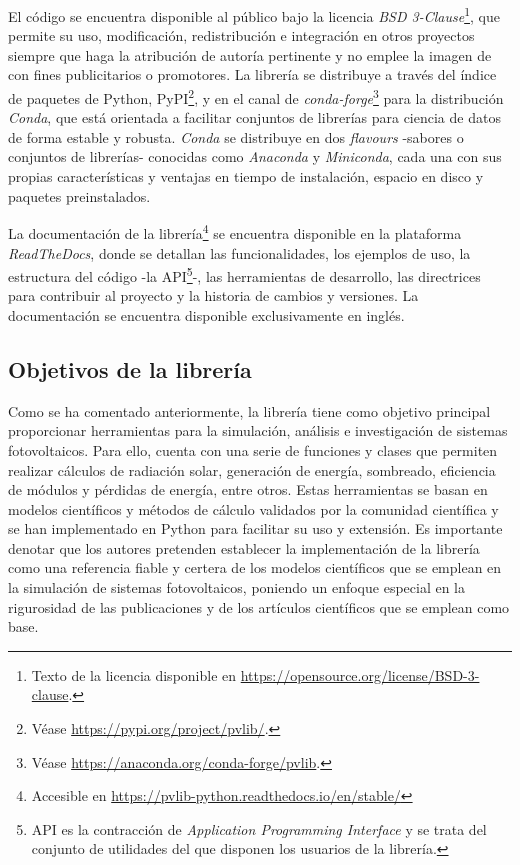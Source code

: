 El código se encuentra disponible al público bajo la licencia \textit{BSD 3-Clause}\footnote{Texto de la licencia disponible en \url{https://opensource.org/license/BSD-3-clause}.}, que permite su uso, modificación, redistribución e integración en otros proyectos siempre que haga la atribución de autoría pertinente y no emplee la imagen de \pvlibpy{} con fines publicitarios o promotores. La librería se distribuye a través del índice de paquetes de Python, PyPI\footnote{Véase \url{https://pypi.org/project/pvlib/}.}, y en el canal de \textit{conda-forge}\footnote{Véase \url{https://anaconda.org/conda-forge/pvlib}.} para la distribución \textit{Conda}, que está orientada a facilitar conjuntos de librerías para ciencia de datos de forma estable y robusta. \textit{Conda} se distribuye en dos \textit{flavours} -sabores o conjuntos de librerías- conocidas como \textit{Anaconda} y \textit{Miniconda}, cada una con sus propias características y ventajas en tiempo de instalación, espacio en disco y paquetes preinstalados.

La documentación de la librería\footnote{Accesible en \url{https://pvlib-python.readthedocs.io/en/stable/}} se encuentra disponible en la plataforma\\ \mbox{\textit{ReadTheDocs}}, donde se detallan las funcionalidades, los ejemplos de uso, la estructura del código -la API\footnote{API es la contracción de \textit{Application Programming Interface} y se trata del conjunto de utilidades del que disponen los usuarios de la librería.}-, las herramientas de desarrollo, las directrices para contribuir al proyecto y la historia de cambios y versiones. La documentación se encuentra disponible exclusivamente en inglés.

\subsection{Objetivos de la librería} \label{ssct:pvlib:objetivos}

Como se ha comentado anteriormente, la librería \pvlibpy{} tiene como objetivo principal proporcionar herramientas para la simulación, análisis e investigación de sistemas fotovoltaicos. Para ello, cuenta con una serie de funciones y clases que permiten realizar cálculos de radiación solar, generación de energía, sombreado, eficiencia de módulos y pérdidas de energía, entre otros. Estas herramientas se basan en modelos científicos y métodos de cálculo validados por la comunidad científica y se han implementado en Python para facilitar su uso y extensión. Es importante denotar que los autores pretenden establecer la implementación de la librería como una referencia fiable y certera de los modelos científicos que se emplean en la simulación de sistemas fotovoltaicos, poniendo un enfoque especial en la rigurosidad de las publicaciones y de los artículos científicos que se emplean como base.

